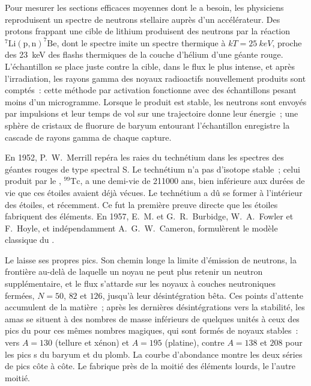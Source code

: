 \begin{inthelab}
Pour mesurer les sections efficaces moyennes dont le  a besoin,
les physiciens reproduisent un spectre de neutrons stellaire auprès d'un accélérateur.
Des protons frappant une cible de lithium produisent des neutrons par la réaction
$^{7}\mathrm{Li}(\mathrm{p},\mathrm{n})^{7}\mathrm{Be}$, dont le spectre
imite un spectre thermique à $kT = \qty{25}{keV}$, proche des
\qty{23}{keV} des flashs thermiques de la couche d'hélium d'une géante rouge. L'échantillon se place
juste contre la cible, dans le flux le plus intense, et après
l'irradiation, les rayons gamma des noyaux radioactifs nouvellement produits sont
comptés~: cette méthode par activation fonctionne avec des échantillons pesant moins
d'un microgramme. Lorsque le produit est stable, les neutrons sont envoyés par impulsions
et leur temps de vol sur une trajectoire donne leur énergie~; une sphère
de cristaux de fluorure de baryum entourant l'échantillon enregistre la
cascade de rayons gamma de chaque capture.
\end{inthelab}

\begin{history}
En 1952, P.~W.~Merrill repéra les raies du technétium dans les spectres des
géantes rouges de type spectral S. Le technétium n'a pas d'isotope stable~; celui
produit par le , $^{99}\mathrm{Tc}$, a une demi-vie de
\num{211000} ans, bien inférieure aux durées de vie que ces étoiles
avaient déjà vécues. Le technétium a dû se former à l'intérieur des étoiles, et
récemment. Ce fut la première preuve directe que les étoiles fabriquent des éléments. En
1957, E.~M. et G.~R.~Burbidge, W.~A.~Fowler et F.~Hoyle, et
indépendamment A.~G.~W.~Cameron, formulèrent le modèle classique du
.
\end{history}

Le  laisse ses propres pics. Son chemin longe la limite
d'émission de neutrons, la frontière au-delà de laquelle un noyau ne peut plus retenir un neutron supplémentaire,
et le flux s'attarde sur les noyaux à couches neutroniques fermées, $N = 50$, $82$ et
$126$, jusqu'à leur désintégration bêta. Ces points d'attente accumulent de la matière~;
après les dernières désintégrations vers la stabilité, les amas se situent à des nombres de masse inférieurs de quelques
unités à ceux des pics du  pour ces mêmes nombres magiques, qui
sont formés de noyaux stables~: vers $A = 130$ (tellure et xénon) et
$A = 195$ (platine), contre $A = 138$ et $208$ pour les pics s
du baryum et du plomb. La courbe d'abondance montre les deux séries de pics côte
à côte. Le  fabrique près de la moitié des éléments lourds, le 
l'autre moitié.

